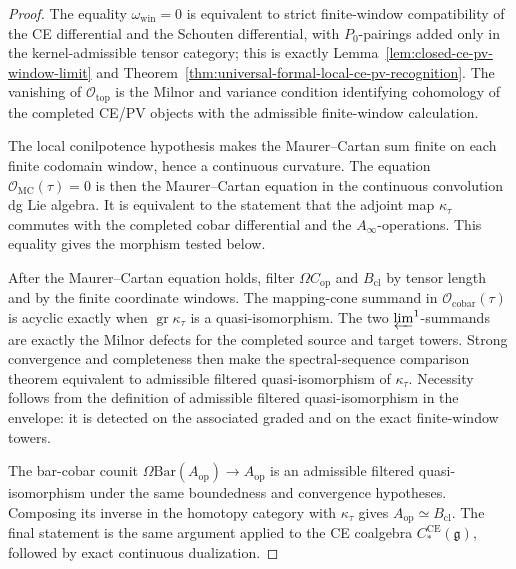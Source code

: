 \begin{proof}
  The equality \(\omega_{\mathrm{win}}=0\) is equivalent to strict
  finite-window compatibility of the CE differential and the Schouten
  differential, with \(P_0\)-pairings added only in the
  kernel-admissible tensor category; this is exactly
  Lemma~\ref{lem:closed-ce-pv-window-limit} and
  Theorem~\ref{thm:universal-formal-local-ce-pv-recognition}.  The
  vanishing of \(\mathcal O_{\mathrm{top}}\) is the Milnor and variance
  condition identifying cohomology of the completed CE/PV objects with
  the admissible finite-window calculation.

  The local conilpotence hypothesis makes the Maurer--Cartan sum finite
  on each finite codomain window, hence a continuous curvature.  The
  equation \(\mathcal O_{\mathrm{MC}}(\tau)=0\) is then the
  Maurer--Cartan equation in the continuous convolution dg Lie algebra.
  It is equivalent to the statement that the adjoint map
  \(\kappa_\tau\) commutes with the completed cobar differential and the
  \(A_\infty\)-operations.  This equality gives the morphism tested
  below.

  After the Maurer--Cartan equation holds, filter
  \(\Omega C_{\mathrm{op}}\) and \(B_{\mathrm{cl}}\) by tensor length
  and by the finite coordinate windows.  The mapping-cone summand in
  \(\mathcal O_{\mathrm{cobar}}(\tau)\) is acyclic exactly when
  \(\operatorname{gr}\kappa_\tau\) is a quasi-isomorphism.  The two
  \(\varprojlim^1\)-summands are exactly the Milnor defects for the
  completed source and target towers.  Strong convergence and
  completeness then make the spectral-sequence comparison theorem
  equivalent to admissible filtered quasi-isomorphism of
  \(\kappa_\tau\).  Necessity follows from the definition of admissible
  filtered quasi-isomorphism in the envelope: it is detected on the
  associated graded and on the exact finite-window towers.

  The bar-cobar counit
  \(\Omega\mathrm{Bar}(A_{\mathrm{op}})\to A_{\mathrm{op}}\) is an
  admissible filtered quasi-isomorphism under the same boundedness and
  convergence hypotheses.  Composing its inverse in the homotopy
  category with \(\kappa_\tau\) gives
  \(A_{\mathrm{op}}\simeq B_{\mathrm{cl}}\).  The final statement is the
  same argument applied to the CE coalgebra
  \(C_*^{\mathrm{CE}}(\mathfrak g)\), followed by exact continuous
  dualization.
\end{proof}

